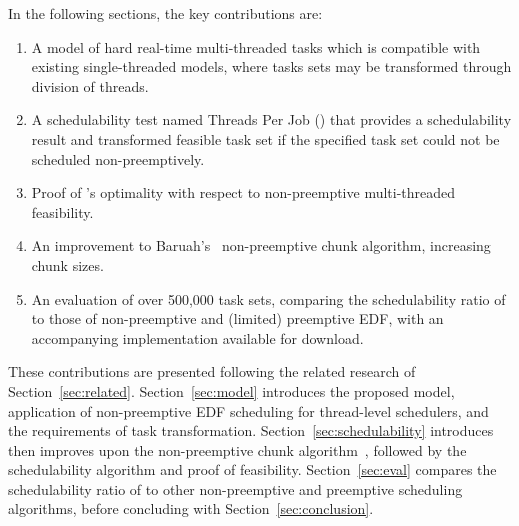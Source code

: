 In the following sections, the key contributions are:
\begin{enumerate}
  \item A model of hard real-time multi-threaded tasks which is
    compatible with existing single-threaded models, where tasks sets
    may be transformed through division of threads.
  \item A schedulability test named Threads Per Job (\tpj{}) that provides a
    schedulability result and transformed feasible task set if the
    specified task set could not be scheduled non-preemptively.
  \item Proof of \tpj{}'s optimality with respect to non-preemptive
    multi-threaded feasibility.
  \item An improvement to Baruah's~\cite{Baruah:2005}
    non-preemptive chunk algorithm, increasing chunk sizes.
  \item An evaluation of over 500,000 task sets, comparing the
    schedulability ratio of \tpj{} to those of non-preemptive and
    (limited) preemptive EDF, with an accompanying implementation available for
    download.
\end{enumerate}

These contributions are presented following the related
research of Section~\ref{sec:related}. Section~\ref{sec:model}
introduces the proposed model, application of non-preemptive EDF
scheduling for thread-level schedulers, and the requirements of task
transformation. Section~\ref{sec:schedulability} introduces then
improves upon the non-preemptive chunk algorithm~\cite{Baruah:2005},
followed by the \tpj{} schedulability algorithm and proof of
feasibility. Section~\ref{sec:eval} compares the schedulability ratio
of \tpj{} to other non-preemptive and preemptive scheduling
algorithms, before concluding with Section~\ref{sec:conclusion}. 

  

